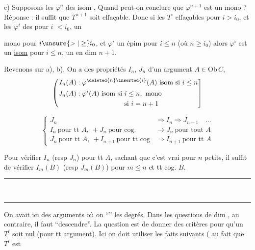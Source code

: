 c) Supposons les $\varphi^n$ des isom ,  Quand peut-on conclure que $\varphi^{n+1}$ est un mono ? Réponse : il suffit que \deleted{\unsure{$\varphi$}} $T^{n+1}$ soit effaçable. Donc si les $T^i$  effaçables pour $i>i_0$, et les $\varphi^i$ des  pour $i$  $<i_0$, un


mono pour $i\unsure{>|\ge}i_0$, et $\varphi^i$ un épim pour $i\le n$ (où $n\ge i_0$) alors $\varphi^i$ est un  \uline{isom} pour $i\le n$, un  en dim $n+1$.

Revenons sur a), b). On a des propriétés  $I_n$, $J_n$ d'un argument $A\in\mathrm{Ob}\,C$,
\[
\left(\begin{aligned}
 I_n(A)&:\varphi^{\deleted{n}\inserted{i}}(A)\ \text{isom si }i\le n\\
 J_n(A)&:\varphi^i(A)\ \text{isom si }i\le n,\ \text{mono}\\
 &\hspace{7em}\text{si }i=n+1
\end{aligned}\right]
\]

\[
\left\{\begin{aligned}
 J_n&\Rightarrow I_n\Rightarrow J_{n-1}\quad\ldots\\
 I_n\ \text{pour tt }A,\ +J_n\ \text{pour cog.}&\to J_n\ \text{pour tout } A\\
 J_n\ \text{pour tt }A,\ +I_{n+1}\ \text{pour tt cog}&\Rightarrow I_{n+1}\ \text{pour tt }A
\end{aligned}\right.
\]

\uline{} Pour vérifier $I_n$ (resp $J_n$) pour tt $A$, sachant que c'est vrai pour $n$ petits, il suffit de vérifier $I_m(B)$ (resp $J_m(B)$) pour $m\le n$ et tt cog. $B$.

\rule{3cm}{0.4pt}\\[-1.5ex]\rule{3cm}{0.4pt}

On avait ici des arguments où on ``'' les degrés. Dans les questions de dim , au contraire, il faut ``descendre''. La question est de donner des critères pour qu'un $T^i$ soit nul (pour tt \uline{argument}). Ici on doit utiliser les faits suivants ( au fait que $T^i$ est

